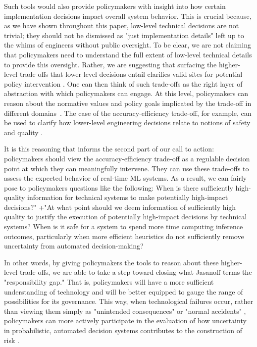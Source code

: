 \documentclass[sigplan,screen]{acmart}
\begin{document}
Such tools would also provide policymakers with insight into how certain implementation decisions impact overall system behavior. This is crucial because, as we have shown throughout this paper, low-level technical decisions are not trivial; they should not be dismissed as "just implementation details" left up to the whims of engineers without public oversight. To be clear, we are not claiming that policymakers need to understand the full extent of low-level technical details to provide this oversight. Rather, we are suggesting that surfacing the higher-level trade-offs that lower-level decisions entail clarifies valid sites for potential policy intervention \cite{cooper2020law, mulligan2018governance, jasanoff2016ethics}. One can then think of such trade-offs as the right layer of abstraction with which policymakers can engage. At this level, policymakers can reason about the normative values and policy goals implicated by the trade-off in different domains~\cite{cooper2020law, flanagan2008values, friedman2019values}. The case of the accuracy-efficiency trade-off, for example, can be used to clarify how lower-level engineering decisions relate to notions of safety and quality \cite{sampson2015thesis}.

It is this reasoning that informs the second part of our call to action: policymakers should view the accuracy-efficiency trade-off as a regulable decision point at which they can meaningfully intervene. They can use these trade-offs to assess the expected behavior of real-time ML systems. As a result, we can fairly pose to policymakers questions like the following: When is there sufficiently high-quality information for technical systems to make potentially high-impact decisions?" +"At what point should we deem information of sufficiently high quality to justify the execution of potentially high-impact decisions by technical systems? When is it safe for a system to spend more time computing inference outcomes, particularly when more efficient heuristics do not sufficiently remove uncertainty from automated decision-making?

In other words, by giving policymakers the tools to reason about these higher-level trade-offs, we are able to take a step toward closing what Jasanoff terms the "responsibility gap." That is, policymakers will have a more sufficient understanding of technology and will be better equipped to gauge the range of possibilities for its governance. This way, when technological failures occur, rather than viewing them simply as "unintended consequences" or "normal accidents" \cite{perrow1999risk}, policymakers can more actively participate in the evaluation of how uncertainty in probabilistic, automated decision systems contributes to the construction of risk \cite{jasanoff2016ethics, hilgartner1992risk}.
\end{document}
